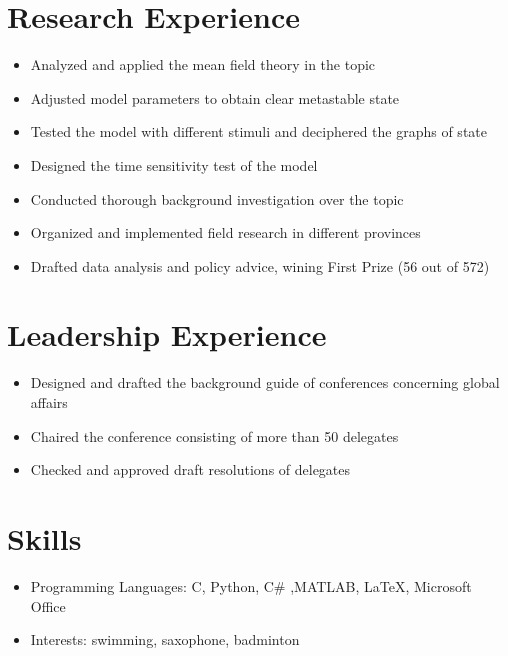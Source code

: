\documentclass{resume}
\begin{document}
\section{\texorpdfstring{\faInstitution}\ Research Experience}
\begin{itemize}
  \item Analyzed and applied the mean field theory in the topic
  \item Adjusted model parameters to obtain clear metastable state
  \item Tested the model with different stimuli and deciphered the graphs of state 
  \item Designed the time sensitivity test of the model 
\end{itemize}
\begin{itemize}
  \item Conducted thorough background investigation over the topic
  \item Organized and implemented field research in different provinces
  \item Drafted data analysis and policy advice, wining First Prize (56 out of 572) 
\end{itemize}

\section{\texorpdfstring{\faUsers}\ Leadership Experience}


\begin{itemize}
  \item Designed and drafted the background guide of conferences concerning global affairs
  \item Chaired the conference consisting of more than 50 delegates
  \item Checked and approved draft resolutions of delegates
\end{itemize}

\section{\texorpdfstring{\faCogs}\ Skills}
\begin{itemize}[parsep=0.5ex]
  \item Programming Languages: C, Python, C\# ,MATLAB, \LaTeX, Microsoft Office
  \item Interests: swimming, saxophone, badminton
\end{itemize}


%
%
\end{document}
